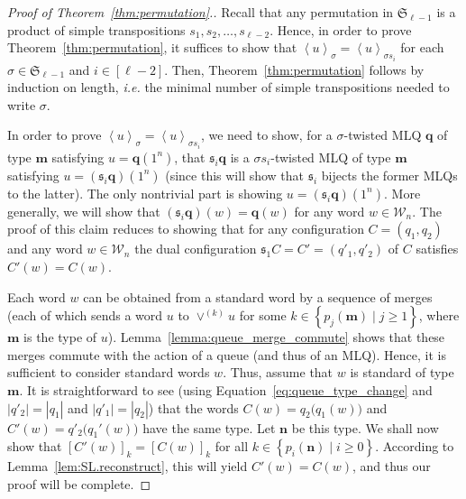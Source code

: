 \documentclass[reqno]{amsart}
\newcommand{\0}{\phantom{c}}
\newcommand{\swt}[1]{\left\langle #1 \right\rangle} %
\newcommand{\SymGp}[1]{\mathfrak{S}_{#1}} %
\newcommand{\mm}{\mathbf{m}}
\newcommand{\nn}{\mathbf{n}}
\newcommand{\qq}{\mathbf{q}}
\newcommand{\mcW}{\mathcal{W}}
\newcommand{\fraks}{\mathfrak{s}}
\newcommand{\set}[1]{\left\{ #1 \right\}}
\newcommand{\abs}[1]{\left| #1 \right|}
\newcommand{\tup}[1]{\left( #1 \right)}
\newcommand{\ive}[1]{\left[ #1 \right]}
\theoremstyle{plain}
\theoremstyle{definition}
\numberwithin{equation}{section}
\begin{document}
\begin{proof}[Proof of Theorem~\ref{thm:permutation}.]
Recall that any permutation in $\SymGp{\ell-1}$ is a product of simple transpositions $s_1, s_2, \ldots, s_{\ell-2}$.
Hence, in order to prove Theorem~\ref{thm:permutation}, it suffices to show that $\swt{u}_{\sigma} = \swt{u}_{\sigma s_i}$ for each $\sigma \in \SymGp{\ell-1}$ and $i \in \ive{\ell-2}$.
Then, Theorem~\ref{thm:permutation} follows by induction on length, \textit{i.e.} the minimal number of simple transpositions needed to write $\sigma$.

In order to prove $\swt{u}_{\sigma} = \swt{u}_{\sigma s_i}$, we need to show, for a $\sigma$-twisted MLQ $\qq$ of type $\mm$ satisfying $u = \qq (1^n)$, that $\fraks_i \qq$ is a $\sigma s_i$-twisted MLQ of type $\mm$ satisfying $u = (\fraks_i \qq) (1^n)$ (since this will show that $\fraks_i$ bijects the former MLQs to the latter).
The only nontrivial part is showing $u = (\fraks_i\qq) (1^n)$.
More generally, we will show that $(\fraks_i\qq)(w) = \qq(w)$ for any word $w \in \mcW_n$.
The proof of this claim reduces to showing that for any configuration $C = \tup{q_1, q_2}$ and any word $w \in \mcW_n$ the dual configuration $\fraks_1 C = C' = (q'_1, q'_2)$ of $C$ satisfies $C'(w) = C(w)$.

Each word $w$ can be obtained from a standard word by a sequence of
merges (each of which sends a word $u$ to $\vee^{(k)} u$ for some
$k \in \set{ p_j(\mm) \mid j \geq 1 }$, where $\mm$ is the type of
$u$). Lemma~\ref{lemma:queue_merge_commute} shows that these merges
commute with the action of a queue (and thus of an MLQ).
Hence, it is sufficient to consider standard words $w$.
Thus, assume that $w$ is standard of type $\mm$.
It is straightforward to see
(using Equation~\eqref{eq:queue_type_change} and $\abs{q'_2} = \abs{q_1}$ and $\abs{q'_1} = \abs{q_2}$)
that the words
$C(w) = q_2\bigl( q_1(w) \bigr)$
and
$C'(w) = q'_2\bigl( q_1'(w) \bigr)$
have the same type.
Let $\nn$ be this type.
We shall now show that
$[C'(w)]_k = [C(w)]_k$
for all $k \in \set{ p_i(\nn) \mid i \geq 0}$.
According to Lemma~\ref{lem:SL.reconstruct}, this will yield $C'(w) = C(w)$, and thus our proof will be complete.


\end{proof}
\end{document}
